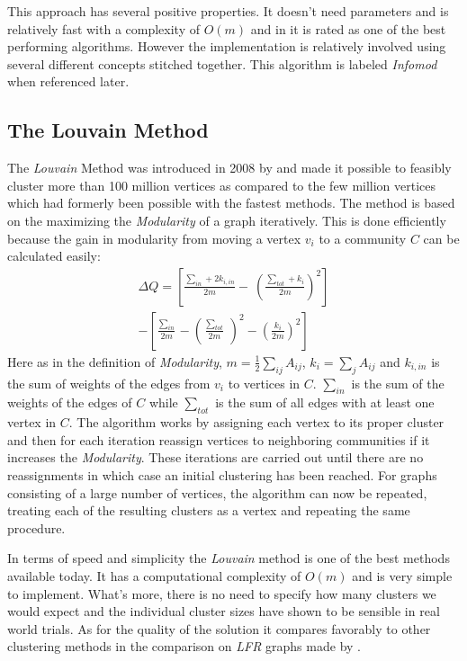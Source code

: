 This approach has several positive properties. It doesn't need 
parameters and is relatively fast with a complexity of $O(m)$ and in 
\cite{lancichinetti2009} it is rated as one of the best performing 
algorithms. However the implementation is relatively involved using 
several different concepts stitched together. This algorithm is labeled 
\emph{Infomod} when referenced later.

\subsection{The Louvain Method}
The \emph{Louvain} Method was introduced in 2008 by \cite{blondel2008} 
and made it possible to feasibly cluster more than 100 million vertices 
as compared to the few million vertices which had formerly been possible 
with the fastest methods. The method is based on the maximizing the 
\emph{Modularity} of a graph iteratively. This is done efficiently 
because the gain in modularity from moving a vertex $v_i$ to a community 
$C$ can be calculated easily:
\begin{multline}
	\Delta Q = \left[ \frac{\sum_{in} + 2 k_{i,in}}{2m} - \
	\left(\frac{\sum_{tot} + k_i}{2m} \right)^2 \right] \\
	- \left[\frac{\sum_{in}}{2m} - \left(\frac{\sum_{tot}}{2m} \
	\right)^2 - \left( \frac{k_i}{2m} \right)^2 \right]
\end{multline}
Here as in the definition of \emph{Modularity}, $m=\frac{1}{2} \sum_{ij} 
A_{ij}$, $k_i = \sum_j A_{ij}$ and $k_{i,in}$ is the sum of weights of 
the edges from $v_i$ to vertices in $C$.  $\sum_{in}$ is the sum of the 
weights of the edges of $C$ while $\sum_{tot}$ is the sum of all edges 
with at least one vertex in $C$.  The algorithm works by assigning each 
vertex to its proper cluster and then for each iteration reassign 
vertices to neighboring communities if it increases the 
\emph{Modularity}.  These iterations are carried out until there are no 
reassignments in which case an initial clustering has been reached.  For 
graphs consisting of a large number of vertices, the algorithm can now 
be repeated, treating each of the resulting clusters as a vertex and 
repeating the same procedure.

In terms of speed and simplicity the \emph{Louvain} method is one of the 
best methods available today. It has a computational complexity of 
$O(m)$ and is very simple to implement. What's more, there is no need to 
specify how many clusters we would expect and the individual cluster 
sizes have shown to be sensible in real world trials.  As for the 
quality of the solution it compares favorably to other clustering 
methods in the comparison on \emph{LFR} graphs made by 
\cite{lancichinetti2009}.


